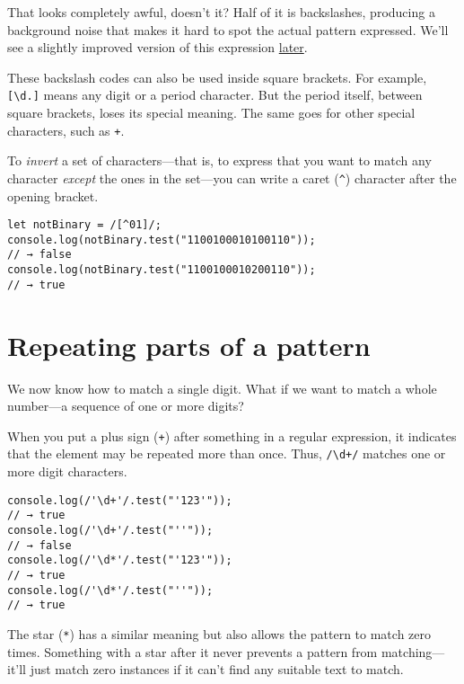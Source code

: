 That looks completely awful, doesn't it? Half of it is backslashes, producing a background noise that makes it hard to spot the actual pattern expressed. We'll see a slightly improved version of this expression \hyperref[regexp.date_regexp_counted]{later}.

These backslash codes can also be used inside square brackets. For example, \lstinline`[\d.]` means any digit or a period character. But the period itself, between square brackets, loses its special meaning. The same goes for other special characters, such as \lstinline`+`.

To \emph{invert} a set of characters—that is, to express that you want to match any character \emph{except} the ones in the set—you can write a caret (\lstinline`^`) character after the opening bracket.

\begin{lstlisting}
let notBinary = /[^01]/;
console.log(notBinary.test("1100100010100110"));
// → false
console.log(notBinary.test("1100100010200110"));
// → true
\end{lstlisting}
\noindent

\section{Repeating parts of a pattern}

We now know how to match a single digit. What if we want to match a whole number—a sequence of one or more digits?

When you put a plus sign (\lstinline`+`) after something in a regular expression, it indicates that the element may be repeated more than once. Thus, \lstinline`/\d+/` matches one or more digit characters.

\begin{lstlisting}
console.log(/'\d+'/.test("'123'"));
// → true
console.log(/'\d+'/.test("''"));
// → false
console.log(/'\d*'/.test("'123'"));
// → true
console.log(/'\d*'/.test("''"));
// → true
\end{lstlisting}
\noindent{}

The star (\lstinline`*`) has a similar meaning but also allows the pattern to match zero times. Something with a star after it never prevents a pattern from matching—it'll just match zero instances if it can't find any suitable text to match.

